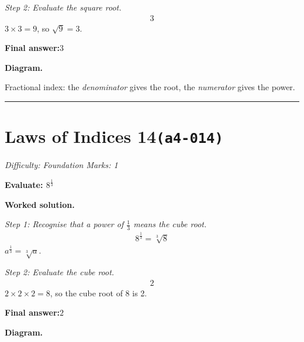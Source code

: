 \documentclass[11pt]{article}
\newcommand{\question}[1]{\par\medskip\noindent\textbf{#1}\par}
\begin{document}
\textit{Step 2: Evaluate the square root.}
\[\begin{gathered}
3
\end{gathered}\]
\( 3 \times 3 = 9 \), so \( \sqrt{9} = 3 \).

\begin{answerbox}
\textbf{Final answer:}\quad \(\displaystyle 3\)
\end{answerbox}
\textbf{Diagram.}

\begin{center}
\end{center}
\small Fractional index: the \emph{denominator} gives the root, the \emph{numerator} gives the power.\normalsize

\medskip\hrule

\section*{Laws of Indices 14\quad\small\texttt{(a4-014)}}
\textit{Difficulty: Foundation \quad\textbar\quad Marks: 1}

\question{Evaluate: \( 8^{\frac{1}{3}} \)}

\textbf{Worked solution.}

\textit{Step 1: Recognise that a power of \( \frac{1}{3} \) means the cube root.}
\[\begin{gathered}
8^{\frac{1}{3}} = \sqrt[3]{8}
\end{gathered}\]
\( a^{\frac{1}{3}} = \sqrt[3]{a} \).

\textit{Step 2: Evaluate the cube root.}
\[\begin{gathered}
2
\end{gathered}\]
\( 2 \times 2 \times 2 = 8 \), so the cube root of 8 is 2.

\begin{answerbox}
\textbf{Final answer:}\quad \(\displaystyle 2\)
\end{answerbox}
\textbf{Diagram.}
\end{document}
